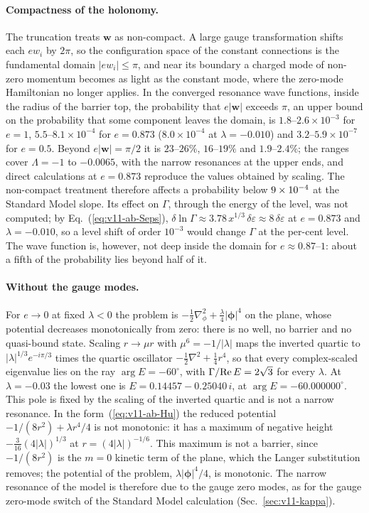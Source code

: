 \paragraph{Compactness of the holonomy.}
The truncation treats $\bm w$ as non-compact.
A large gauge transformation shifts each $ew_i$ by $2\pi$, so the configuration space of the constant connections is the fundamental domain $|ew_i|\le\pi$, and near its boundary a charged mode of non-zero momentum becomes as light as the constant mode, where the zero-mode Hamiltonian no longer applies.
In the converged resonance wave functions, inside the radius of the barrier top, the probability that $e|\bm w|$ exceeds $\pi$, an upper bound on the probability that some component leaves the domain, is $1.8$--$2.6\times10^{-3}$ for $e=1$, $5.5$--$8.1\times10^{-4}$ for $e=0.873$ ($8.0\times10^{-4}$ at $\lambda=-0.010$) and $3.2$--$5.9\times10^{-7}$ for $e=0.5$. %
Beyond $e|\bm w|=\pi/2$ it is $23$--$26\%$, $16$--$19\%$ and $1.9$--$2.4\%$; the ranges cover $\Lambda=-1$ to $-0.0065$, with the narrow resonances at the upper ends, and direct calculations at $e=0.873$ reproduce the values obtained by scaling. %
The non-compact treatment therefore affects a probability below $9\times10^{-4}$ at the Standard Model slope. %
Its effect on $\Gamma$, through the energy of the level, was not computed; by Eq.~(\ref{eq:v11-ab-Seps}), $\delta\ln\Gamma\approx3.78\,x^{1/3}\,\delta\varepsilon\approx8\,\delta\varepsilon$ at $e=0.873$ and $\lambda=-0.010$, so a level shift of order $10^{-3}$ would change $\Gamma$ at the per-cent level. %
The wave function is, however, not deep inside the domain for $e\approx0.87$--$1$: about a fifth of the probability lies beyond half of it. %

\paragraph{Without the gauge modes.}
For $e\to0$ at fixed $\lambda<0$ the problem is $-\frac12\nabla_\phi^2+\frac\lambda4|\bm\phi|^4$ on the plane, whose potential decreases monotonically from zero: there is no well, no barrier and no quasi-bound state.
Scaling $r\to\mu r$ with $\mu^6=-1/|\lambda|$ maps the inverted quartic to $|\lambda|^{1/3}e^{-i\pi/3}$ times the quartic oscillator $-\frac12\nabla^2+\frac14r^4$, so that every complex-scaled eigenvalue lies on the ray $\arg E=-60^\circ$, with $\Gamma/{\rm Re}\,E=2\sqrt3$ for every $\lambda$.
At $\lambda=-0.03$ the lowest one is $E=0.14457-0.25040\,i$, at $\arg E=-60.000000^\circ$. %
This pole is fixed by the scaling of the inverted quartic and is not a narrow resonance.
In the form~(\ref{eq:v11-ab-Hu}) the reduced potential $-1/(8r^2)+\lambda r^4/4$ is not monotonic: it has a maximum of negative height $-\frac{3}{16}(4|\lambda|)^{1/3}$ at $r=(4|\lambda|)^{-1/6}$.
This maximum is not a barrier, since $-1/(8r^2)$ is the $m=0$ kinetic term of the plane, which the Langer substitution removes; the potential of the problem, $\lambda|\bm\phi|^4/4$, is monotonic.
The narrow resonance of the model is therefore due to the gauge zero modes, as for the gauge zero-mode switch of the Standard Model calculation (Sec.~\ref{sec:v11-kappa}).

